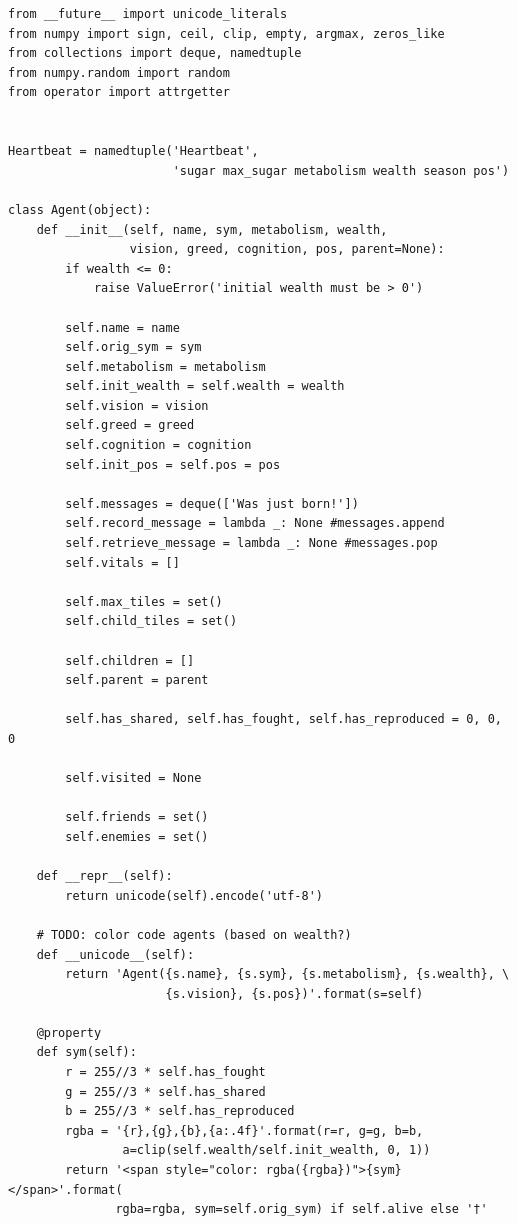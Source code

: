 \begin{verbatim}
from __future__ import unicode_literals
from numpy import sign, ceil, clip, empty, argmax, zeros_like
from collections import deque, namedtuple
from numpy.random import random
from operator import attrgetter


Heartbeat = namedtuple('Heartbeat', 
                       'sugar max_sugar metabolism wealth season pos')

class Agent(object):
    def __init__(self, name, sym, metabolism, wealth, 
                 vision, greed, cognition, pos, parent=None):
        if wealth <= 0:
            raise ValueError('initial wealth must be > 0')
        
        self.name = name
        self.orig_sym = sym
        self.metabolism = metabolism
        self.init_wealth = self.wealth = wealth
        self.vision = vision
        self.greed = greed
        self.cognition = cognition
        self.init_pos = self.pos = pos
        
        self.messages = deque(['Was just born!'])
        self.record_message = lambda _: None #messages.append
        self.retrieve_message = lambda _: None #messages.pop
        self.vitals = []
        
        self.max_tiles = set()
        self.child_tiles = set()
        
        self.children = []
        self.parent = parent
        
        self.has_shared, self.has_fought, self.has_reproduced = 0, 0, 0
        
        self.visited = None
        
        self.friends = set()
        self.enemies = set()
       
    def __repr__(self):
        return unicode(self).encode('utf-8')
    
    # TODO: color code agents (based on wealth?)
    def __unicode__(self):
        return 'Agent({s.name}, {s.sym}, {s.metabolism}, {s.wealth}, \
                      {s.vision}, {s.pos})'.format(s=self)
    
    @property
    def sym(self):
        r = 255//3 * self.has_fought
        g = 255//3 * self.has_shared 
        b = 255//3 * self.has_reproduced 
        rgba = '{r},{g},{b},{a:.4f}'.format(r=r, g=g, b=b, 
                a=clip(self.wealth/self.init_wealth, 0, 1))
        return '<span style="color: rgba({rgba})">{sym}</span>'.format(
               rgba=rgba, sym=self.orig_sym) if self.alive else '†'
    

\end{verbatim}

